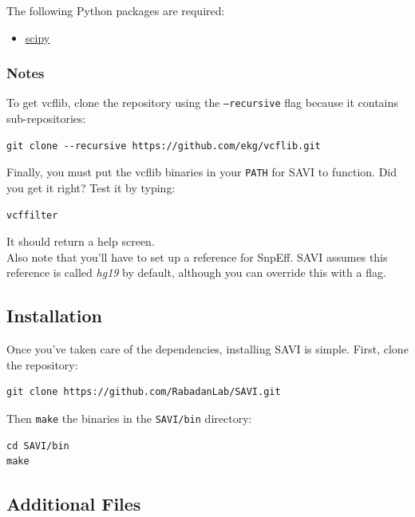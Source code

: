 \documentclass[letterpaper,14pt]{memoir}
\begin{document}
\noindent The following Python packages are required:

\begin{itemize}
\tightlist
\item
  \href{http://www.scipy.org}{scipy}
\end{itemize}

\subsubsection{Notes}

\noindent To get vcflib, clone the repository using the \texttt{--recursive} flag because it contains sub-repositories:

\begin{Verbatim}
git clone --recursive https://github.com/ekg/vcflib.git
\end{Verbatim}

\noindent Finally, you must put the vcflib binaries in your \texttt{PATH} for SAVI to function. Did you get it right? Test it by typing:

\begin{Verbatim}
vcffilter
\end{Verbatim}

\noindent It should return a help screen.\\ 

\noindent Also note that you'll have to set up a reference for SnpEff. SAVI assumes this reference is called \textit{hg19} by default, although you can override this with a flag.

\subsection{Installation}\label{Installation}

\noindent Once you've taken care of the dependencies, installing SAVI is simple. First, clone the repository:

\begin{Verbatim}
git clone https://github.com/RabadanLab/SAVI.git
\end{Verbatim}

\noindent Then \texttt{make}
the binaries in the \texttt{SAVI/bin} directory:

\begin{Verbatim}
cd SAVI/bin
make
\end{Verbatim}

\subsection{Additional Files}\label{Additional Files}
\end{document}
